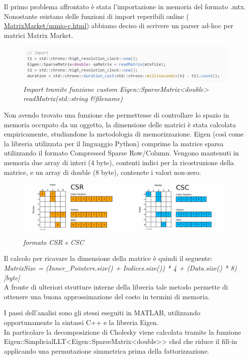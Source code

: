 \documentclass[a4paper,10pt]{article}
\begin{document}
Il primo problema affrontato è stata l’importazione in memoria del formato .mtx. Nonostante esistano delle funzioni di import reperibili online ( \href{https://math.nist.gov/MatrixMarket/mmio-c.html}{MatrixMarket/mmio-c.html}) abbiamo deciso di scrivere un parser ad-hoc per matrici Matrix Market. %

\begin{figure}[H]
\centering
\includegraphics[width=0.7\linewidth]{img/c++1.jpg}
\caption{\textit{Import tramite funzione custom Eigen::SparseMatrix<double> readMatrix(std::string \&filename)}}
\end{figure}

Non avendo trovato una funzione che permettesse di controllare lo spazio in memoria occupato da un oggetto, la dimensione delle matrici è stata calcolata empiricamente, studiandone la metodologia di memorizzazione. 
Eigen (così come la libreria utilizzata per il linguaggio Python) comprime la matrice sparsa utilizzando il formato Compressed Sparse Row/Column. Vengono mantenuti in memoria due array di interi (4 byte), contenti indici per la ricostruzione della matrice, e un array di double (8 byte), contenete i valori non-zero.

\begin{figure}[H]
\centering
\includegraphics[width=0.7\linewidth]{img/c++2.jpg}
\caption{\textit{formato CSR e CSC}}
\end{figure}

Il calcolo per ricavare la dimensione della matrice è quindi il seguente: \\
\textit{MatrixSize = (Inner\_Pointers.size() + Indices.size()) * 4 + (Data.size() * 8) [byte]} \\

A fronte di ulteriori strutture interne della libreria tale metodo permette di ottenere una buona approssimazione del costo in termini di memoria.

I passi dell’analisi sono gli stessi eseguiti in MATLAB, utilizzando opportunamente la sintassi C++ e la libreria Eigen.\\
In particolare la decomposizione di Cholesky viene calcolata tramite la funzione Eigen::SimplicialLLT<Eigen::SparseMatrix<double>> chol che riduce il fill-in applicando una permutazione simmetrica prima della fattorizzazione. %
\end{document}
